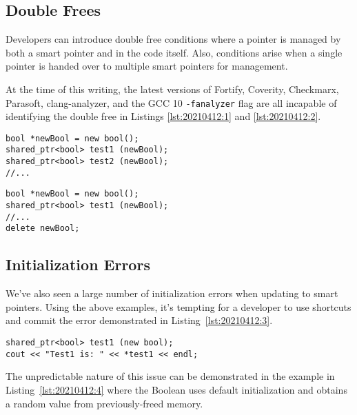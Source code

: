 \subsection{Double Frees}

Developers can introduce double free conditions where a pointer is managed by both a smart pointer and in the code itself. Also, conditions arise when a single pointer is handed over to multiple smart pointers for management.

At the time of this writing, the latest versions of Fortify, Coverity, Checkmarx, Parasoft, clang-analyzer, and the GCC 10 \texttt{-fanalyzer} flag are all incapable of identifying the double free in Listings \ref{lst:20210412:1} and \ref{lst:20210412:2}.

\begin{lstlisting}[caption={Double Smart Pointer},captionpos=b,style=CStyle,basicstyle=\small,label={lst:20210412:1}]
bool *newBool = new bool();
shared_ptr<bool> test1 (newBool);
shared_ptr<bool> test2 (newBool);
//...
\end{lstlisting}

\begin{lstlisting}[caption={Smart and Dumb Pointer},captionpos=b,style=CStyle,basicstyle=\small,label={lst:20210412:2}]
bool *newBool = new bool();
shared_ptr<bool> test1 (newBool);
//...
delete newBool;
\end{lstlisting}

\subsection{Initialization Errors}

We've also seen a large number of initialization errors when updating to smart pointers. Using the above examples, it's tempting for a developer to use shortcuts and commit the error demonstrated in Listing~\ref{lst:20210412:3}.

\begin{lstlisting}[caption={Uninitialized Boolean},captionpos=b,style=CStyle,basicstyle=\small,label={lst:20210412:3}]
shared_ptr<bool> test1 (new bool);
cout << "Test1 is: " << *test1 << endl;
\end{lstlisting}

The unpredictable nature of this issue can be demonstrated in the example in Listing~\ref{lst:20210412:4} where the Boolean uses default initialization and obtains a random value from previously-freed memory.

